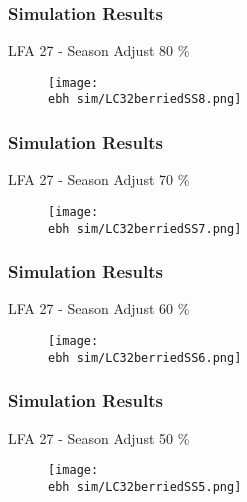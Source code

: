 \documentclass{beamer}
\newcommand{\ebh}{\string~/bio.data/bio.lobster/figures/LFA2733Framework2018/} %
\begin{document}
\begin{frame}
\frametitle{Simulation Results}
LFA 27 - Season Adjust 80 \%
\begin{figure}
        \begin{center}
            \texttt{[image: \\ebh sim/LC32berriedSS8.png]}
        \end{center}
    \end{figure}
\end{frame}


\begin{frame}
\frametitle{Simulation Results}
LFA 27 - Season Adjust 70 \%
\begin{figure}
        \begin{center}
            \texttt{[image: \\ebh sim/LC32berriedSS7.png]}
        \end{center}
    \end{figure}
\end{frame}


\begin{frame}
\frametitle{Simulation Results}
LFA 27 - Season Adjust 60 \%
\begin{figure}
        \begin{center}
            \texttt{[image: \\ebh sim/LC32berriedSS6.png]}
        \end{center}
    \end{figure}
\end{frame}


\begin{frame}
\frametitle{Simulation Results}
LFA 27 - Season Adjust 50 \%
\begin{figure}
        \begin{center}
            \texttt{[image: \\ebh sim/LC32berriedSS5.png]}
        \end{center}
    \end{figure}
\end{frame}
\end{document}
